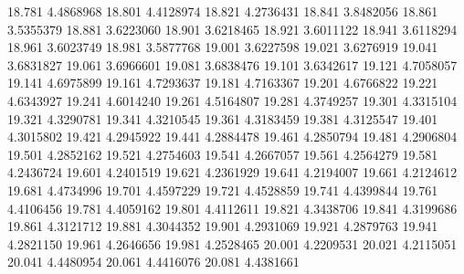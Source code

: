18.781 4.4868968
18.801 4.4128974
18.821 4.2736431
18.841 3.8482056
18.861 3.5355379
18.881 3.6223060
18.901 3.6218465
18.921 3.6011122
18.941 3.6118294
18.961 3.6023749
18.981 3.5877768
19.001 3.6227598
19.021 3.6276919
19.041 3.6831827
19.061 3.6966601
19.081 3.6838476
19.101 3.6342617
19.121 4.7058057
19.141 4.6975899
19.161 4.7293637
19.181 4.7163367
19.201 4.6766822
19.221 4.6343927
19.241 4.6014240
19.261 4.5164807
19.281 4.3749257
19.301 4.3315104
19.321 4.3290781
19.341 4.3210545
19.361 4.3183459
19.381 4.3125547
19.401 4.3015802
19.421 4.2945922
19.441 4.2884478
19.461 4.2850794
19.481 4.2906804
19.501 4.2852162
19.521 4.2754603
19.541 4.2667057
19.561 4.2564279
19.581 4.2436724
19.601 4.2401519
19.621 4.2361929
19.641 4.2194007
19.661 4.2124612
19.681 4.4734996
19.701 4.4597229
19.721 4.4528859
19.741 4.4399844
19.761 4.4106456
19.781 4.4059162
19.801 4.4112611
19.821 4.3438706
19.841 4.3199686
19.861 4.3121712
19.881 4.3044352
19.901 4.2931069
19.921 4.2879763
19.941 4.2821150
19.961 4.2646656
19.981 4.2528465
20.001 4.2209531
20.021 4.2115051
20.041 4.4480954
20.061 4.4416076
20.081 4.4381661
